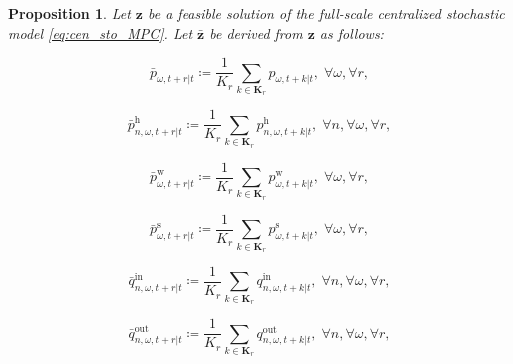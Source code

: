 \documentclass[10pt,a4paper]{amsart}
\newtheorem{proposition}{Proposition}
\begin{document}
\begin{proposition}\label{prop:main_result}
Let $\boldsymbol{z}$ be a feasible solution of the full-scale centralized stochastic model \eqref{eq:cen_sto_MPC}.
Let $\boldsymbol{\bar{z}}$ be derived from $\boldsymbol{z}$ as follows:

\noindent
\begin{minipage}{0.5\textwidth}
\begin{equation}\label{prop_agg_vars1}
\bar{p}_{\omega,t+r|t} \coloneqq
\frac{1}{K_r} \sum_{k \in \boldsymbol{K}_r} p_{\omega,t+k|t},
\; \forall \omega, \forall r,
\end{equation}
\end{minipage}%
\hfill
\begin{minipage}{0.5\textwidth}
\begin{equation}\label{prop_agg_vars2}
\bar{p}^{\mathrm{h}}_{n,\omega,t+r|t} \coloneqq
\frac{1}{K_r} \sum_{k \in \boldsymbol{K}_r}
p^{\mathrm{h}}_{n,\omega,t+k|t},
\; \forall n, \forall \omega, \forall r,
\end{equation}
\end{minipage}

\noindent
\begin{minipage}{0.5\textwidth}
\begin{equation}\label{prop_agg_vars3}
\bar{p}^{\mathrm{w}}_{\omega,t+r|t} \coloneqq
\frac{1}{K_r} \sum_{k \in \boldsymbol{K}_r}
p^{\mathrm{w}}_{\omega,t+k|t},
\; \forall \omega, \forall r,
\end{equation}
\end{minipage}%
\hfill
\begin{minipage}{0.5\textwidth}
\begin{equation}\label{prop_agg_vars4}
\bar{p}^{\mathrm{s}}_{\omega,t+r|t} \coloneqq
\frac{1}{K_r} \sum_{k \in \boldsymbol{K}_r}
p^{\mathrm{s}}_{\omega,t+k|t},
\; \forall \omega, \forall r,
\end{equation}
\end{minipage}

\noindent
\begin{minipage}{0.5\textwidth}
\begin{equation}\label{prop_agg_vars5}
\bar{q}^{\mathrm{in}}_{n,\omega,t+r|t} \coloneqq
\frac{1}{K_r} \sum_{k \in \boldsymbol{K}_r}
q^{\mathrm{in}}_{n,\omega,t+k|t},
\; \forall n, \forall \omega, \forall r,
\end{equation}
\end{minipage}%
\hfill
\begin{minipage}{0.5\textwidth}
\begin{equation}\label{prop_agg_vars6}
\bar{q}^{\mathrm{out}}_{n,\omega,t+r|t} \coloneqq
\frac{1}{K_r} \sum_{k \in \boldsymbol{K}_r}
q^{\mathrm{out}}_{n,\omega,t+k|t},
\; \forall n, \forall \omega, \forall r,
\end{equation}
\end{minipage}


\end{proposition}
\end{document}
